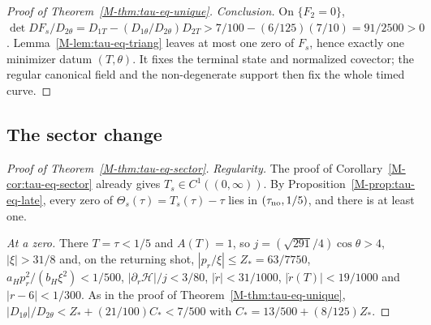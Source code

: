 \documentclass[aip,jmp,amsmath,amssymb,reprint]{revtex4-2}
\theoremstyle{plain}
\theoremstyle{definition}
\begin{document}
\begin{proof}[Proof of Theorem~\ref{M-thm:tau-eq-unique}]
\emph{Conclusion.} On $\{F_2=0\}$,
$\det DF_s/D_{2\theta}=D_{1T}-(D_{1\theta}/D_{2\theta})D_{2T}>7/100-(6/125)(7/10)=91/2500>0$.
Lemma~\ref{M-lem:tau-eq-triang} leaves at most one zero of $F_s$, hence exactly one minimizer
datum $(T,\theta)$. It fixes the terminal state and normalized covector; the regular canonical
field and the non-degenerate support then fix the whole timed curve.
\end{proof}

\subsection{The sector change}
\begin{proof}[Proof of Theorem~\ref{M-thm:tau-eq-sector}]
\emph{Regularity.} The proof of Corollary~\ref{M-cor:tau-eq-sector} already gives
$T_s\in C^1((0,\infty))$. By Proposition~\ref{M-prop:tau-eq-late}, every zero of
$\Theta_s(\tau)=T_s(\tau)-\tau$ lies in $(\tau_{\rm no},1/5)$, and there is at least one.

\emph{At a zero.} There $T=\tau<1/5$ and $A(T)=1$, so $j=(\sqrt{291}/4)\cos\theta>4$, $|\xi|>31/8$ and, on the
returning shot, $|p_r/\xi|\le Z_*=63/7750$, $a_Hp_r^2/(b_H\xi^2)<1/500$, $|\partial_r\mathcal H|/j<3/80$,
$|\dot r|<31/1000$, $|\dot r(T)|<19/1000$ and $|r-6|<1/300$. As in the proof of
Theorem~\ref{M-thm:tau-eq-unique}, $|D_{1\theta}|/D_{2\theta}<Z_*+(21/100)C_*<7/500$ with $C_*=13/500+(8/125)Z_*$.


\end{proof}
\end{document}
